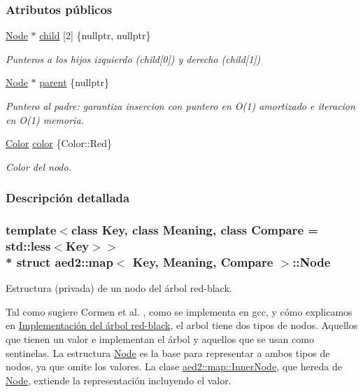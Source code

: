 \subsubsection*{Atributos públicos}
\begin{DoxyCompactItemize}
\item 
\hyperlink{structaed2_1_1map_1_1Node}{Node} $\ast$ \hyperlink{structaed2_1_1map_1_1Node_a7d65c374c73c443a46d8fc224aff9e82_a7d65c374c73c443a46d8fc224aff9e82}{child} \mbox{[}2\mbox{]} \{nullptr, nullptr\}
\begin{DoxyCompactList}\small\item\em Punteros a los hijos izquierdo (child\mbox{[}0\mbox{]}) y derecho (child\mbox{[}1\mbox{]}) \end{DoxyCompactList}\item 
\hyperlink{structaed2_1_1map_1_1Node}{Node} $\ast$ \hyperlink{structaed2_1_1map_1_1Node_ab6a5f9e471b311755e4a56834086cb90_ab6a5f9e471b311755e4a56834086cb90}{parent} \{nullptr\}
\begin{DoxyCompactList}\small\item\em Puntero al padre\+: garantiza insercion con puntero en O(1) amortizado e iteracion en O(1) memoria. \end{DoxyCompactList}\item 
\hyperlink{classaed2_1_1map_a6d62a415a4b9d320b30cada4ebcf9f5b_a6d62a415a4b9d320b30cada4ebcf9f5b}{Color} \hyperlink{structaed2_1_1map_1_1Node_a58dd9993fee8ee3eaa5716b72a3eca47_a58dd9993fee8ee3eaa5716b72a3eca47}{color} \{Color\+::\+Red\}
\begin{DoxyCompactList}\small\item\em Color del nodo. \end{DoxyCompactList}\end{DoxyCompactItemize}


\subsubsection{Descripción detallada}
\subsubsection*{template$<$class Key, class Meaning, class Compare = std\+::less$<$\+Key$>$$>$\\*
struct aed2\+::map$<$ Key, Meaning, Compare $>$\+::\+Node}

Estructura (privada) de un nodo del árbol red-\/black. 

Tal como sugiere Cormen et al. \cite{CormenLeisersonRivestStein2009}, como se implementa en gcc, y cómo explicamos en \hyperlink{Implementacion}{Implementación del árbol red-\/black}, el arbol tiene dos tipos de nodos. Aquellos que tienen un valor e implementan el árbol y aquellos que se usan como sentinelas. La estructura \hyperlink{structaed2_1_1map_1_1Node}{Node} es la base para representar a ambos tipos de nodos, ya que omite los valores. La clase \hyperlink{structaed2_1_1map_1_1InnerNode}{aed2\+::map\+::\+Inner\+Node}, que hereda de \hyperlink{structaed2_1_1map_1_1Node}{Node}, extiende la representación incluyendo el valor.

